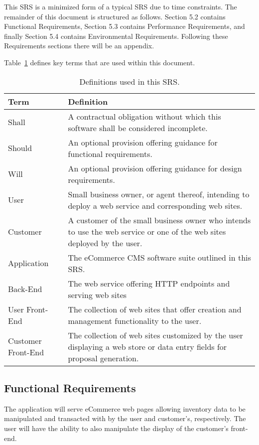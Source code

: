 \documentclass{article}
\begin{document}
This SRS is a minimized form of a typical SRS due to time constraints.  The
remainder of this document is structured as follows.  Section 5.2 contains 
Functional Requirements, Section 5.3 contains Performance Requirements, and 
finally Section 5.4 contains Environmental Requirements.  Following these
Requirements sections there will be an appendix.

Table~\ref{terms} defines key terms that are used within this document.

\begin{table}
    \begin{tabular}{|l|p{11cm}|}\hline
        Term & Definition \\\hline\hline
        Shall & A contractual obligation without which this software shall be considered incomplete. \\\hline
        Should & An optional provision offering guidance for functional requirements. \\\hline
        Will & An optional provision offering guidance for design requirements. \\\hline
        User & Small business owner, or agent thereof, intending to deploy a web service
        and corresponding web sites. \\\hline
        Customer & A customer of the small business owner who intends to use the web service
        or one of the web sites deployed by the user. \\\hline
        Application & The eCommerce CMS software suite outlined in this SRS. \\\hline
        Back-End & The web service offering HTTP endpoints and serving web sites \\\hline
        User Front-End & The collection of web sites that offer creation and management
        functionality to the user. \\\hline
        Customer Front-End & The collection of web sites customized by the user displaying
        a web store or data entry fields for proposal generation.\\\hline
    \end{tabular}
    \caption{Definitions used in this SRS.}
    \label{terms}
\end{table}

\subsection{Functional Requirements}

The application will serve eCommerce web pages allowing inventory data to be
manipulated and transacted with by the user and customer's, respectively.  The
user will have the ability to also manipulate the display of the customer's
front-end.
\end{document}

